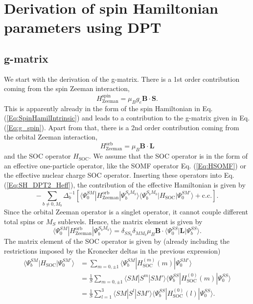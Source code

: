 \section{Derivation of spin Hamiltonian parameters using DPT}
\label{Sec:appendix_DPT_SH}
\subsection{g-matrix}
We start with the derivation of the g-matrix. There is a 1st order contribution coming from the spin Zeeman interaction,
\begin{equation}
H_\text{Zeeman}^\text{spin} = \mu_B g_e \mathbf{B}\cdot \mathbf{S}.
\end{equation}
This is apparently already in the form of the spin Hamiltonian in Eq. (\ref{Eq:SpinHamilIntrinsic}) and leads to a contribution to the g-matrix given in Eq. (\ref{Eq:g_spin}). Apart from that, there is a 2nd order contribution coming from the orbital Zeeman interaction,
\begin{equation}
H_\text{Zeeman}^\text{orb} = \mu_B \mathbf{B} \cdot \mathbf{L}
\end{equation}
and the SOC operator $H_\text{SOC}$. We assume that the SOC operator is in the form of an effective one-particle operator, like the SOMF operator Eq. (\ref{Eq:HSOMF}) or the effective nuclear charge SOC operator.\cite{KosekGSM_1995_12764} Inserting these operators into Eq. (\ref{Eq:SH_DPT2_Heff}), the contribution of the effective Hamiltonian is given by
\begin{equation}
\label{Eq:SH_Heff_contribution}
- \sum_{b\neq 0, M_b} \Delta_b^{-1}[\langle \Psi_0^{SM}|H_\text{Zeeman}^\text{orb}|\Psi_b^{S_b M_b}\rangle \langle \Psi_b^{S_b M_b}| H_\text{SOC} | \Psi_0^{SM'}\rangle + \text{c.c.}].
\end{equation}
Since the orbital Zeeman operator is a singlet operator, it cannot couple different total spins or $M_S$ sublevels. Hence, the matrix element is given by
\begin{equation}
\label{Eq:Matrixel_orbZeeman}
\langle \Psi_0^{SM}|H_\text{Zeeman}^\text{orb}|\Psi_b^{S_b M_b}\rangle = \delta_{SS_b} \delta_{MM_b} \mu_B \mathbf{B} \cdot \langle \Psi_0^{SS}|\mathbf{L}|\Psi_b^{SS}\rangle.
\end{equation}
The matrix element of the SOC operator is given by (already including the restrictions imposed by the Kronecker deltas in the previous expression)
\begin{equation}
\label{Eq:Matrixel_SOC}
\begin{aligned}
\langle \Psi_b^{SM}|H_\text{SOC}|\Psi_0^{SM'}\rangle &= \sum_{m=0, \pm 1} \langle \Psi_b^{SM}|H_\text{SOC}^{(m)}(m)|\Psi_0^{SM'}\rangle \\
&= \frac{1}{S} \sum_{m=0, \pm 1} \langle SM|S^m|SM'\rangle\langle \Psi_b^{SS}|H_\text{SOC}^{(0)}(m)|\Psi_0^{SS}\rangle \\
&= \frac{1}{S} \sum_{l=1}^3 \langle SM|S^l|SM'\rangle\langle \Psi_b^{SS}|H_\text{SOC}^{(0)}(l)|\Psi_0^{SS}\rangle.
\end{aligned}
\end{equation}
